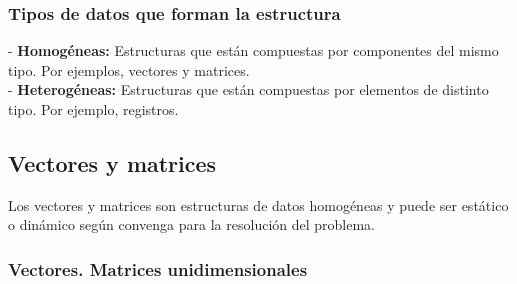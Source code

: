 \documentclass[12pt,letterpaper]{article}
\begin{document}
\subsubsection{Tipos de datos que forman la estructura}
\noindent
- \textbf{Homogéneas:} Estructuras que están compuestas por componentes del mismo tipo. Por ejemplos, vectores y matrices.\\
- \textbf{Heterogéneas:} Estructuras que están compuestas por elementos de distinto tipo. Por ejemplo, registros.

\subsection{Vectores y matrices}

Los vectores y matrices son estructuras de datos homogéneas y puede ser estático o dinámico según convenga para la resolución del problema.

\subsubsection{Vectores. Matrices unidimensionales}
\end{document}
